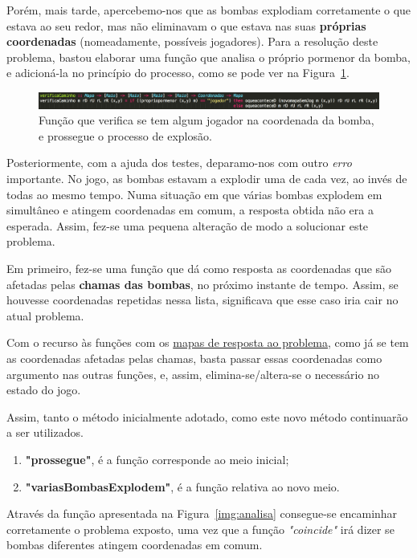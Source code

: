 \documentclass[a4paper]{article}
\begin{document}
Porém, mais tarde, apercebemo-nos que as bombas explodiam corretamente o que estava ao seu redor, 
mas não eliminavam o que estava nas suas \textbf{próprias coordenadas} (nomeadamente, possíveis jogadores). 
Para a resolução deste problema, bastou elaborar uma função que analisa o próprio pormenor da bomba, 
e adicioná-la no princípio do processo, como se pode ver na Figura~\ref{img:verificaCaminho}.

\begin{figure}[H]
\centering 
\includegraphics[scale=0.40]{verificaCaminho}
\caption{Função que verifica se tem algum jogador na coordenada da bomba, e prossegue o processo de explosão.}
\label{img:verificaCaminho}
\end{figure}

Posteriormente, com a ajuda dos testes, deparamo-nos com outro \emph{erro} importante. No jogo, 
as bombas estavam a explodir uma de cada vez, ao invés de todas ao mesmo tempo. Numa situação em 
que várias bombas explodem em simultâneo e atingem coordenadas em comum, a resposta obtida não era 
a esperada. Assim, fez-se uma pequena alteração de modo a solucionar este problema.

Em primeiro, fez-se uma função que dá como resposta as coordenadas que são afetadas pelas \textbf{chamas 
das bombas}, no próximo instante de tempo. Assim, se houvesse coordenadas repetidas nessa lista, 
significava que esse caso iria cair no atual problema. 

Com o recurso às funções com os \hyperlink{6funções}{mapas de resposta ao problema}, como já se tem 
as coordenadas afetadas pelas chamas, basta passar essas coordenadas como argumento nas outras 
funções, e, assim, elimina-se/altera-se o necessário no estado do jogo.

Assim, tanto o método inicialmente adotado, como este novo método continuarão a ser utilizados.
\begin{enumerate} 
	\item \textbf{"prossegue"}, é a função corresponde ao meio inicial;
	\item \textbf{"variasBombasExplodem"}, é a função relativa ao novo meio.
\end{enumerate}

Através da função apresentada na Figura~\ref{img:analisa} consegue-se encaminhar 
corretamente o problema exposto, uma vez que a função \emph{"coincide"} irá dizer se bombas diferentes 
atingem coordenadas em comum. 
\end{document}
